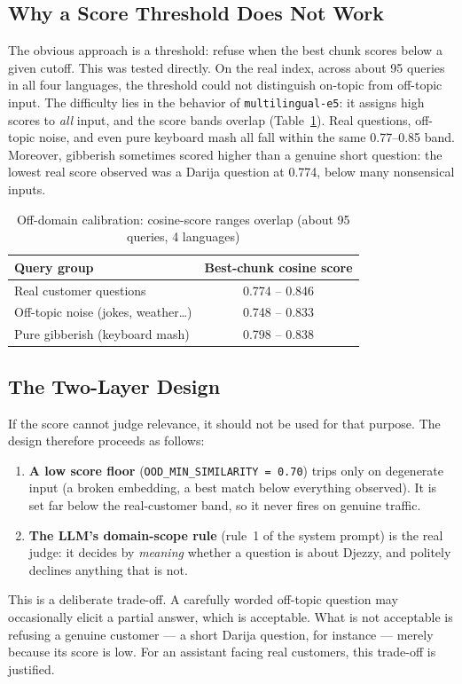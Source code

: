 \documentclass[12pt, a4paper]{report}
\newcommand{\humantext}[1]{#1}      %
\begin{document}
\subsection{Why a Score Threshold Does Not Work}
\humantext{The obvious approach is a threshold: refuse when the best chunk scores below a given cutoff. This was tested directly. On the real index, across about 95 queries in all four languages, the threshold could not distinguish on-topic from off-topic input. The difficulty lies in the behavior of \texttt{multilingual-e5}: it assigns high scores to \emph{all} input, and the score bands overlap (Table~\ref{tab:ood_calib}). Real questions, off-topic noise, and even pure keyboard mash all fall within the same 0.77--0.85 band. Moreover, gibberish sometimes scored higher than a genuine short question: the lowest real score observed was a Darija question at 0.774, below many nonsensical inputs.}

\begin{table}[H]
\centering
\caption{Off-domain calibration: cosine-score ranges overlap (about 95 queries, 4 languages)}
\label{tab:ood_calib}
\begin{tabularx}{\textwidth}{X c}
\toprule
\textbf{Query group} & \textbf{Best-chunk cosine score} \\
\midrule
Real customer questions               & 0.774 -- 0.846 \\
Off-topic noise (jokes, weather\ldots) & 0.748 -- 0.833 \\
Pure gibberish (keyboard mash)        & 0.798 -- 0.838 \\
\bottomrule
\end{tabularx}
\end{table}

\subsection{The Two-Layer Design}
\humantext{If the score cannot judge relevance, it should not be used for that purpose. The design therefore proceeds as follows:}
\begin{enumerate}[noitemsep]
    \item \humantext{\textbf{A low score floor} (\texttt{OOD\_MIN\_SIMILARITY = 0.70}) trips only on degenerate input (a broken embedding, a best match below everything observed). It is set far below the real-customer band, so it never fires on genuine traffic.}
    \item \humantext{\textbf{The LLM's domain-scope rule} (rule~1 of the system prompt) is the real judge: it decides by \emph{meaning} whether a question is about Djezzy, and politely declines anything that is not.}
\end{enumerate}
\humantext{This is a deliberate trade-off. A carefully worded off-topic question may occasionally elicit a partial answer, which is acceptable. What is not acceptable is refusing a genuine customer --- a short Darija question, for instance --- merely because its score is low. For an assistant facing real customers, this trade-off is justified.}
\end{document}
